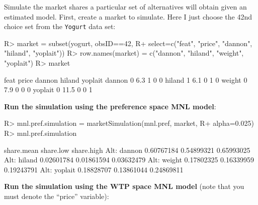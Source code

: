 \documentclass[article]{jss}
\begin{document}
Simulate the market shares a particular set of alternatives will obtain
given an estimated model. First, create a market to simulate. Here I
just choose the 42nd choice set from the \texttt{Yogurt} data set:

\begin{CodeChunk}

\begin{CodeInput}
R> market = subset(yogurt, obsID==42,
R+          select=c("feat", "price", "dannon", "hiland", "yoplait"))
R> row.names(market) = c("dannon", "hiland", "weight", "yoplait")
R> market
\end{CodeInput}

\begin{CodeOutput}
        feat price dannon hiland yoplait
dannon     0   6.3      1      0       0
hiland     1   6.1      0      1       0
weight     0   7.9      0      0       0
yoplait    0  11.5      0      0       1
\end{CodeOutput}
\end{CodeChunk}

\textbf{Run the simulation using the preference space MNL model}:

\begin{CodeChunk}

\begin{CodeInput}
R> mnl.pref.simulation = marketSimulation(mnl.pref, market, 
R+                                        alpha=0.025)
R> mnl.pref.simulation
\end{CodeInput}

\begin{CodeOutput}
             share.mean  share.low share.high
Alt: dannon  0.60767184 0.54899321 0.65993025
Alt: hiland  0.02601784 0.01861594 0.03632479
Alt: weight  0.17802325 0.16339959 0.19243791
Alt: yoplait 0.18828707 0.13861044 0.24869811
\end{CodeOutput}
\end{CodeChunk}

\textbf{Run the simulation using the WTP space MNL model} (note that you
must denote the ``price'' variable):
\end{document}
